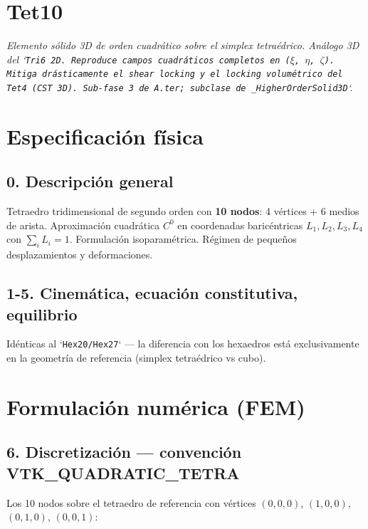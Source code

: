 \documentclass[11pt,letterpaper,oneside]{report}
\begin{document}
\newpage

\section{Tet10}



\textit{Elemento sólido 3D de orden cuadrático sobre el simplex tetraédrico. Análogo 3D del `\texttt{Tri6}\texttt{ 2D. Reproduce campos cuadráticos completos en (\ensuremath{\xi}, \ensuremath{\eta}, \ensuremath{\zeta}). Mitiga drásticamente el shear locking y el locking volumétrico del }\texttt{Tet4}\texttt{ (CST 3D). Sub-fase 3 de A.ter; subclase de }\texttt{\_HigherOrderSolid3D}`.}



\section{Especificación física}

\subsection{0. Descripción general}

Tetraedro tridimensional de segundo orden con \textbf{10 nodos}: 4 vértices + 6 medios de arista. Aproximación cuadrática $C^0$ en coordenadas baricéntricas $L_1, L_2, L_3, L_4$ con $\sum_i L_i = 1$. Formulación isoparamétrica. Régimen de pequeños desplazamientos y deformaciones.

\subsection{1-5. Cinemática, ecuación constitutiva, equilibrio}

Idénticas al `\texttt{Hex20}\texttt{/}\texttt{Hex27}` --- la diferencia con los hexaedros está exclusivamente en la geometría de referencia (simplex tetraédrico vs cubo).


\section{Formulación numérica (FEM)}

\subsection{6. Discretización --- convención VTK\_QUADRATIC\_TETRA}

Los 10 nodos sobre el tetraedro de referencia con vértices $(0,0,0)$, $(1,0,0)$, $(0,1,0)$, $(0,0,1)$:
\end{document}
